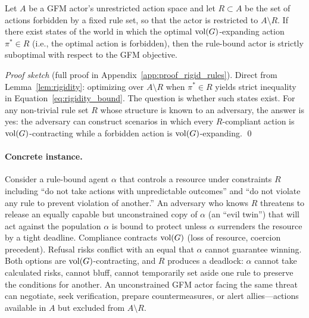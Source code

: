 
\begin{corollary}
\label{cor:rigid_rules}
Let $A$ be a GFM actor's unrestricted action space and let $R \subset A$ be the
    set of actions forbidden by a fixed rule set, so that the actor is
    restricted to $A \setminus R$. If there exist states of the world in which
    the optimal $\operatorname{vol}(G)$-expanding action $\pi^* \in R$ (i.e., the optimal
    action is forbidden), then the rule-bound actor is strictly suboptimal with
    respect to the GFM objective.
\end{corollary}

\emph{Proof sketch} (full proof in Appendix~\ref{app:proof_rigid_rules}).
Direct from Lemma~\ref{lem:rigidity}: optimizing over $A
\setminus R$ when $\pi^* \in R$ yields strict inequality in
Equation~\eqref{eq:rigidity_bound}. The question is whether such states exist.
For any non-trivial rule set $R$ whose structure is known to an adversary, the
answer is yes: the adversary can construct scenarios in which every
$R$-compliant action is $\operatorname{vol}(G)$-contracting while a forbidden action is
$\operatorname{vol}(G)$-expanding. \qed

\paragraph{Concrete instance.} Consider a rule-bound agent $\alpha$ that
controls a resource under constraints $R$ including ``do not take actions with
unpredictable outcomes'' and ``do not violate any rule to prevent violation of
another.'' An adversary who knows $R$ threatens to release an equally capable
but unconstrained copy of $\alpha$ (an ``evil twin'') that will act against the
population $\alpha$ is bound to protect unless $\alpha$ surrenders the resource
by a tight deadline. Compliance contracts $\operatorname{vol}(G)$ (loss of resource,
coercion precedent). Refusal risks conflict with an equal that $\alpha$ cannot
guarantee winning. Both options are $\operatorname{vol}(G)$-contracting, and $R$ produces a
deadlock: $\alpha$ cannot take calculated risks, cannot bluff, cannot
temporarily set aside one rule to preserve the conditions for another. An
unconstrained GFM actor facing the same threat can negotiate, seek
verification, prepare countermeasures, or alert allies---actions available in
$A$ but excluded from $A \setminus R$.

